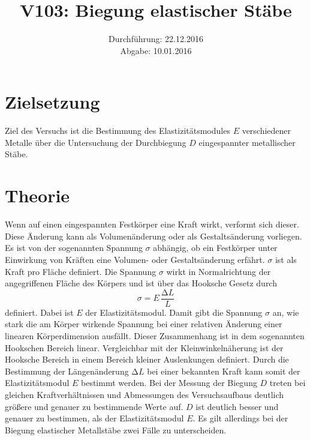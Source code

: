 \documentclass[
  bibliography=totoc,     %
  captions=tableheading,  %
  titlepage=firstiscover, %
]{scrartcl}
\title{V103: Biegung elastischer Stäbe}
\author{
  Simon Schulte
  \texorpdfstring{
    \\
    \href{mailto:simon.schulte@udo.edu}{simon.schulte@udo.edu}
  }{}
  \texorpdfstring{\and}{, }
  Tim Sedlaczek
  \texorpdfstring{
    \\
    \href{mailto:tim.sedlaczek@udo.edu}{tim.sedlaczek@udo.edu}
  }{}
}
\date{Durchführung: 22.12.2016\\
      Abgabe: 10.01.2016}
\begin{document}
\maketitle
\thispagestyle{empty}
\tableofcontents
\newpage
\section{Zielsetzung}
\label{sec:zielsetzung}
Ziel des Versuchs ist die Bestimmung des Elastizitätsmodules $E$ verschiedener
Metalle über die Untersuchung der Durchbiegung $D$ eingespannter metallischer Stäbe.
\section{Theorie}
\label{sec:theorie}
Wenn auf einen eingespannten Festkörper eine Kraft wirkt, verformt sich dieser.
Diese Änderung kann als Volumenänderung oder als Gestaltsänderung vorliegen.
Es ist von der sogenannten Spannung $\sigma$ abhängig, ob ein Festkörper
unter Einwirkung von Kräften eine Volumen- oder Gestaltsänderung erfährt.
$\sigma$ ist als Kraft pro Fläche definiert. Die Spannung $\sigma$ wirkt in
Normalrichtung der angegriffenen Fläche des Körpers und ist über das Hooksche
Gesetz durch
\begin{equation}
	\sigma=E\,\frac{\mathup{\Delta}L}{L}
	\label{eq:spannung}
\end{equation}
definiert. Dabei ist $E$ der Elastizitätsmodul. Damit gibt die Spannung $\sigma$
an, wie stark die am Körper wirkende Spannung bei einer relativen Änderung einer
linearen Körperdimension ausfällt. Dieser Zusammenhang ist in dem sogenannten
Hookschen Bereich linear. Vergleichbar mit der Kleinwinkelnäherung ist der
Hooksche Bereich in einem Bereich kleiner Auslenkungen definiert. Durch die
Bestimmung der Längenänderung $\mathup{\Delta}L$ bei einer bekannten Kraft
kann somit der Elastizitätsmodul $E$ bestimmt werden. Bei der Messung der Biegung
$D$ treten bei gleichen Kraftverhältnissen und Abmessungen des Versuchsaufbaus
deutlich größere und genauer zu bestimmende Werte auf. $D$ ist deutlich besser
und genauer zu bestimmen, als der Elastizitätsmodul $E$. Es gilt allerdings bei
der Biegung elastischer Metallstäbe zwei Fälle zu unterscheiden.
\end{document}

